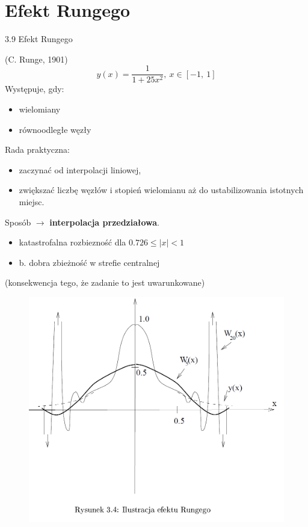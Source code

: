 \section{Efekt Rungego}
\begin{frame}
{3.9 Efekt Rungego}

(C. Runge, 1901)
$$
y(x)=\frac{1}{1+25x^{2}},\ x\in[-1,\ 1]
$$
Występuje, gdy:
\begin{itemize}
\item wielomiany

\item równoodległe węzły
\end{itemize}

Rada praktyczna:

\begin{itemize}
\item zaczynać od interpolacji liniowej,

\item zwiększać liczbę węzłów i stopień wielomianu aż do ustabilizowania istotnych miejsc.
\end{itemize}


Sposób $\rightarrow$ \textbf{interpolacja przedziałowa}.
\begin{itemize}
\item katastrofalna rozbiezność dla $0.726\leq|x|<1$

\item b. dobra zbieżność w strefie centralnej
\end{itemize}

(konsekwencja tego, że zadanie to jest { uwarunkowane})
\end{frame}
\begin{frame}
\begin{figure}[h]
			\includegraphics[scale=0.35]{img/3/interpol_3_9}
	\end{figure}
\end{frame}